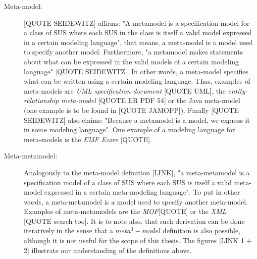\documentclass[tuberlin,cic,tc,openright,english,noabntcite]{iiufrgs}
\begin{document}
\begin{description}
\item[Meta-model:] [QUOTE SEIDEWITZ] affirms: "A metamodel is a specification model for a class of SUS where each SUS in the class is itself a valid model expressed in a certain modeling language", that means, a meta-model is a model used to specify another model. Furthermore, "a metamodel makes statements about what can be expressed in the valid models of a certain modeling language" [QUOTE SEIDEWITZ]. In other words, a meta-model specifies what can be written using a certain modeling language. Thus, examples of meta-models are \emph{UML specification document} [QUOTE UML], the \emph{entity-relationship meta-model} [QUOTE ER PDF 54] or the Java meta-model (one example is to be found in [QUOTE JAMOPP]). Finally [QUOTE SEIDEWITZ] also claims: "Because a metamodel is a model, we express it in some modeling language". One example of a modeling language for meta-models is the \emph{EMF Ecore} [QUOTE].

\item[Meta-metamodel:] Analogously to the meta-model definition [LINK], "a meta-metamodel is a specification model of a class of SUS where each SUS is itself a valid meta-model expressed in a certain meta-modeling language". To put in other words, a meta-metamodel is a model used to specify another meta-model. Examples of meta-metamodels are the \emph{MOF}[QUOTE] or the \emph{XML} [QUOTE search too]. It is to note also, that such derivation can be done iteratively in the sense that a $meta^3-model$ definition is also possible, although it is not useful for the scope of this thesis. The figures [LINK 1 + 2] illustrate our understanding of the definitions above.


\end{description}
\end{document}
